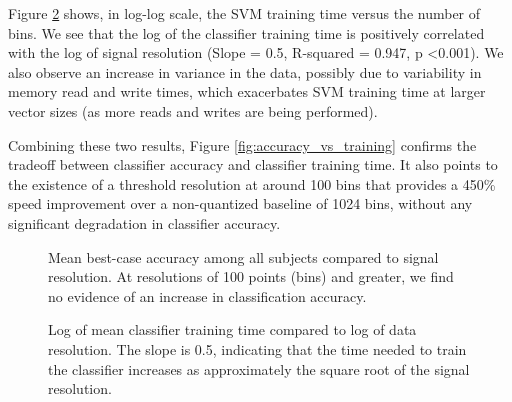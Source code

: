 

Figure \ref{fig:training_vs_bins} shows, in log-log scale, the SVM training time versus the number of bins. We see that the log of the classifier training time is positively correlated with the log of signal resolution (Slope = 0.5, R-squared = 0.947, p \textless 0.001). We also observe an increase in variance in the data, possibly due to variability in memory read and write times, which exacerbates SVM training time at larger vector sizes (as more reads and writes are being performed).

Combining these two results, Figure \ref{fig:accuracy_vs_training} confirms the tradeoff between classifier accuracy and classifier training time. It also points to the existence of a threshold resolution at around 100 bins that provides a 450\% speed improvement over a non-quantized baseline of 1024 bins, without any significant degradation in classifier accuracy.


\begin{figure}[!h]
  \centering
   {}
  \caption{Mean best-case accuracy among all subjects compared to signal resolution. At resolutions of 100 points (bins) and greater, we find no evidence of an increase in classification accuracy. }
  \label{fig:accuracy_vs_bins}
  \vspace{-0.1cm}
 \end{figure}

 \begin{figure}[!h]
  \vspace{-0.2cm}
  \centering
   {}
  \caption{Log of mean classifier training time compared to log of data resolution. The slope is 0.5, indicating that the time needed to train the classifier increases as approximately the square root of the signal resolution.}
  \label{fig:training_vs_bins}
  \vspace{-0.1cm}
 \end{figure}

